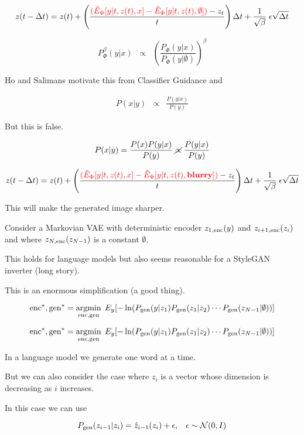 {\vfill
{\huge $$z(t - \Delta t) = z(t) + \left(\frac{{\color{red}(\hat{E}_\Phi[y|t,z(t),x] - \hat{E}_\Phi[y|t,z(t),\emptyset])} - z_t}{t}\right)\Delta t
+ \frac{1}{\sqrt{\beta}}\;\epsilon\sqrt{\Delta t}$$}


$$P^\beta_\Phi(y|x) \;\;\propto \;\;  \left(\frac{P_\Phi(y|x)}{P_\Phi(y|\emptyset)}\right)^\beta$$

\vfill
Ho and Salimans motivate this from Classifier Guidance and

\vfill
{\huge \begin{eqnarray*}
P(x|y) & \propto & \frac{P(y|x)}{P(y)}
\end{eqnarray*}}

\vfill
But this is false.

\vfill
{\huge $$P(x|y) = \frac{P(x)P(y|x)}{P(y)} \;\cancel{\propto}\;\frac{P(y|x)}{P(y)}$$}


{\huge $$z(t - \Delta t) = z(t) + \left(\frac{{\color{red} (\hat{E}_\Phi[y|t,z(t),x] - \hat{E}_\Phi[y|t,z(t),\bf{blurry}])} - z_t}{t}\right)\Delta t
+ \frac{1}{\sqrt{\beta}}\;\epsilon\sqrt{\Delta t}$$}

\vfill
This will make the generated image sharper.


Consider a Markovian VAE with deterministic encoder $z_{1,\mathrm{enc}}(y)$ and $z_{i+1,\mathrm{enc}}(z_i)$ and where $z_{N,\mathrm{enc}}(z_{N-1})$ is a constant $\emptyset$.

\vfill
This holds for language models but also seems reasonable for a StyleGAN inverter (long story).

\vfill
This is an enormous simplification (a good thing).

{\huge
$$\mathrm{enc}^*,\mathrm{gen}^* = \operatorname*{argmin}_{\mathrm{enc},\mathrm{gen}} \;E_y[- \ln (P_{\mathrm{gen}}(y|z_1)P_{\mathrm{gen}}(z_1|z_2)\cdots P_{\mathrm{gen}}(z_{N-1}|\emptyset))]$$
}


{\huge
$$\mathrm{enc}^*,\mathrm{gen}^* = \operatorname*{argmin}_{\mathrm{enc},\mathrm{gen}} \;E_y[- \ln (P_{\mathrm{gen}}(y|z_1)P_{\mathrm{gen}}(z_1|z_2)\cdots P_{\mathrm{gen}}(z_{N-1}|\emptyset))]$$
}

\vfill
In a language model we generate one word at a time.

\vfill
But we can also consider the case where $z_i$ is a vector whose dimension is decreasing as $i$ increases.

\vfill
In this case we can use

$$P_{\mathrm{gen}}(z_{i-1}|z_i) = \hat{z}_{i-1}(z_i) + \epsilon,\;\;\;\epsilon\sim {\cal N}(0,I)$$

}
